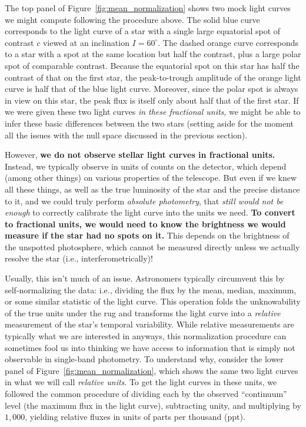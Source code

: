 \documentclass[modern]{aastex62}
\begin{document}
The top panel of Figure~\ref{fig:mean_normalization} shows two mock
light curves we might compute following the procedure above. The solid blue
curve corresponds to the light curve of a star with a single large
equatorial spot of contrast $c$ viewed at an inclination $I = 60^\circ$.
The dashed orange curve corresponds to a star with a spot at the same
location but half the contrast, plus a large polar spot of comparable
contrast. Because the equatorial spot on this star has half the contrast of that on
the first star, the peak-to-trough amplitude of the orange light curve is half that of
the blue light curve. Moreover, since the polar spot is always in view on
this star, the peak flux is itself only about half that of the first star.
If we were given these two light curves \emph{in these fractional units},
we might be able to infer these basic differences between the two stars
(setting aside for the moment all the issues with the null space discussed
in the previous section).

However, \textbf{we do not observe stellar light curves in fractional units.}
Instead, we typically observe in units of counts on
the detector, which depend (among other things) on various properties of the telescope.
But even if we knew all these things, as well as the true luminosity
of the star and the precise distance to it, and we could truly
perform \emph{absolute photometry}, that \emph{still would not be enough}
to correctly calibrate the light curve into the units we need.
\textbf{To convert to fractional units, we would need to know the brightness we would
    measure if the star had no spots on it.} This depends on the brightness
of the unspotted photosphere, which cannot be measured directly unless
we actually resolve the star (i.e., interferometrically)!

Usually, this isn't much of an issue. Astronomers typically circumvent
this by self-normalizing the data: i.e., dividing the flux by the mean,
median, maximum, or some similar statistic of the light curve.
%
This operation folds the unknowability of
the true units under the rug and transforms the light curve into a \emph{relative}
measurement of the star's temporal variability. While relative measurements
are typically what we are interested in anyways, this normalization procedure
can sometimes fool us into thinking we have access to information that
is simply not observable in single-band photometry. To understand why,
consider the lower panel of Figure~\ref{fig:mean_normalization}, which shows the
same two light curves in what we will call \emph{relative units}. To
get the light curves in these units, we followed the common procedure of
dividing each by the observed ``continuum'' level (the maximum flux in the
light curve), subtracting unity, and multiplying by $1{,}000$, yielding
relative fluxes in units of parts per thousand (ppt).
\end{document}
